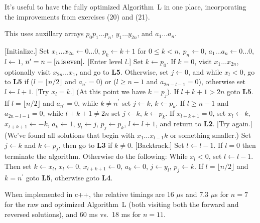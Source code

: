 \vskip 0.1in

\noindent It's useful to have the fully optimized Algorithm~L in one place, 
incorporating the improvements from exercises (20) and (21).  

\noindent This uses auxillary arrays $p_0 p_1 \ldots p_n$, $y_1 \ldots y_{2n}$, 
and $a_1 \ldots a_n$.

 [Initialize.] Set $x_1 \ldots x_{2 n} \leftarrow 0 
\ldots 0$, $p_k \leftarrow k + 1$ for $0 \leq k < n$, $p_n \leftarrow 0$, 
$a_{1} \ldots a_{n} \leftarrow 0 \ldots 0$, $l \leftarrow 1$,
$n^{\prime} = n - [n \rm{\, is\, even}].$
\vskip 0.05in
 [Enter level $l$.] Set $k \gets p_0$.  If $k = 0$, visit
$x_1 \ldots x_{2n}$, optionally visit $x_{2n} \ldots x_1$, and 
go to {\bf L5}.  Otherwise, set $j \leftarrow 0$, and
while $x_l < 0$, go to {\bf L5} if ($l = \lfloor n / 2 \rfloor$ and 
$a_{n^{\prime}} = 0$) or ($l \ge n - 1$ and $a_{2n - l - 1} = 0$), otherwise
set $l \leftarrow l + 1$.
\vskip 0.05in
 [Try $x_l = k$.] (At this point we have $k = p_j$).  
If $l + k + 1 > 2n$ goto {\bf L5}.  If $l = \lfloor n / 2 \rfloor$ and 
$a_{n^{\prime}} = 0$, while $k \ne n^{\prime}$ set $j \leftarrow k$, 
$k \leftarrow p_k$.  If $l \ge n - 1$ and $a_{2n - l - 1} = 0$, while 
$l + k + 1 \ne 2 n $ set $j \leftarrow k$, $k \leftarrow p_k$.  If 
$x_{l + k + 1} = 0$, set $x_l \leftarrow k$, $x_{l + k + 1} \leftarrow - k$,
$a_k \leftarrow 1$, $y_l \leftarrow j$, $p_j \leftarrow p_k$, 
$l \leftarrow l + 1$, and return to {\bf L2}.
\vskip 0.05in
 [Try again.] (We've found all solutions that begin with 
$x_1 \ldots x_{l-1} k$ or something smaller.) Set $j \leftarrow k$ and 
$k \leftarrow p_j$, then go to {\bf L3} if $k \ne 0$.
\vskip 0.05in
 [Backtrack.] Set $l \leftarrow l - 1$.   If $l = 0$ then 
terminate the algorithm. Otherwise do the following: While $x_l < 0$, set 
$l \leftarrow l - 1$.  Then set $k \leftarrow x_l$, $x_l \leftarrow 0$, 
$x_{l + k + 1} \leftarrow 0$, $a_k \leftarrow 0$, $j \leftarrow y_l$, 
$p_j \leftarrow k$.  If $l = \lfloor n / 2 \rfloor$ and $k = n^{\prime}$
goto {\bf L5}, otherwise goto {\bf L4}.

When implemented in c++, the relative timings are 16 $\mu$s and 7.3 $\mu$s 
for $n = 7$ for the raw and optimized Algorithm~L (both visiting both the 
forward and reversed solutions), and 60 ms vs.\ 18 ms for $n = 11$.

\bye

\bye